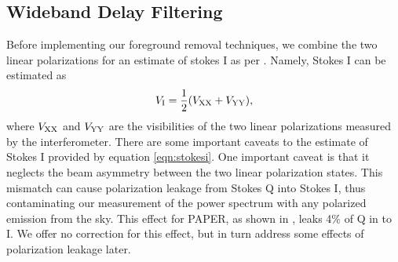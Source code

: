 \documentclass[twocolumn,numberedappendix]{emulateapj} \shorttitle{PSA64}
\begin{document}
%
%



\subsection{Wideband Delay Filtering}\label{sec:wbd_filtering}


Before implementing our foreground removal techniques, we combine the two
linear polarizations for an estimate of stokes I as per \citet{moore_et_al2013}.
Namely, Stokes I can be estimated as 
\begin{equation}\label{eqn:stokesi}
    V_{\rm I} = \frac12(V_{\rm XX}+V_{\rm YY}),
\end{equation}
where $V_{\rm XX}$ and $V_{\rm YY}$ are the visibilities of the two linear
polarizations measured by the interferometer. There are some important caveats
to the estimate of Stokes I provided by equation \ref{eqn:stokesi}. One
important caveat is that it neglects the beam asymmetry  between the two linear
polarization states. This mismatch can cause polarization leakage from Stokes
Q into Stokes I, thus contaminating  our measurement of the power spectrum with any polarized emission from the sky.
This effect for PAPER, as shown in \citet{moore_et_al2013}, leaks 4\% of Q in to
I.  We offer no correction for this effect, but in turn address some effects of 
polarization leakage later. 
\end{document}

